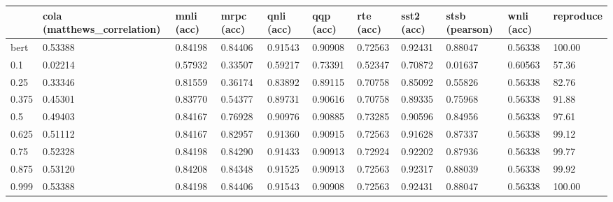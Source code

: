 \begin{tabular}{lllllllllll}
\toprule
{} & cola (matthews\_correlation) & mnli (acc) & mrpc (acc) & qnli (acc) & qqp (acc) & rte (acc) & sst2 (acc) & stsb (pearson) & wnli (acc) & reproduce \\
\midrule
bert  &                     0.53388 &    0.84198 &    0.84406 &    0.91543 &   0.90908 &   0.72563 &    0.92431 &        0.88047 &    0.56338 &    100.00 \\
0.1   &                     0.02214 &    0.57932 &    0.33507 &    0.59217 &   0.73391 &   0.52347 &    0.70872 &        0.01637 &    0.60563 &     57.36 \\
0.25  &                     0.33346 &    0.81559 &    0.36174 &    0.83892 &   0.89115 &   0.70758 &    0.85092 &        0.55826 &    0.56338 &     82.76 \\
0.375 &                     0.45301 &    0.83770 &    0.54377 &    0.89731 &   0.90616 &   0.70758 &    0.89335 &        0.75968 &    0.56338 &     91.88 \\
0.5   &                     0.49403 &    0.84167 &    0.76928 &    0.90976 &   0.90885 &   0.73285 &    0.90596 &        0.84956 &    0.56338 &     97.61 \\
0.625 &                     0.51112 &    0.84167 &    0.82957 &    0.91360 &   0.90915 &   0.72563 &    0.91628 &        0.87337 &    0.56338 &     99.12 \\
0.75  &                     0.52328 &    0.84198 &    0.84290 &    0.91433 &   0.90913 &   0.72924 &    0.92202 &        0.87936 &    0.56338 &     99.77 \\
0.875 &                     0.53120 &    0.84208 &    0.84348 &    0.91525 &   0.90913 &   0.72563 &    0.92317 &        0.88039 &    0.56338 &     99.92 \\
0.999 &                     0.53388 &    0.84198 &    0.84406 &    0.91543 &   0.90908 &   0.72563 &    0.92431 &        0.88047 &    0.56338 &    100.00 \\
\bottomrule
\end{tabular}
